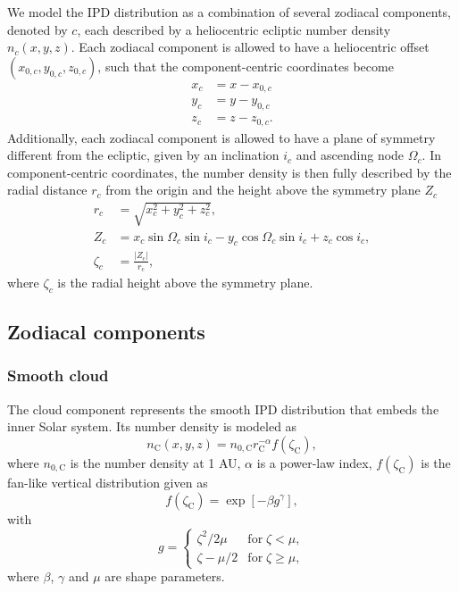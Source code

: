 \documentclass[twocolumn]{aa}
\begin{document}
We model the IPD distribution as a combination of several zodiacal 
components, denoted by $c$, each described by a heliocentric ecliptic 
number density $n_c(x,y,z)$. Each zodiacal component is allowed to have 
a heliocentric offset $(x_{0,c}, y_{0,c}, z_{0,c})$, such that the 
component-centric coordinates become
\begin{equation}    
    \begin{aligned}
        x_c&= x - x_{0,c}\\
        y_c&= y - y_{0,c}\\
        z_c&= z - z_{0,c}.
    \end{aligned}
\end{equation}
Additionally, each zodiacal component is allowed to have a plane of 
symmetry different from the ecliptic, given by an inclination $i_c$ and 
ascending node $\Omega_c$. In component-centric coordinates, the number 
density is then fully described by the radial distance $r_c$ from the 
origin and the height above the symmetry plane $Z_c$
\begin{align}
    r_c &= \sqrt{x_c^2 + y_c^2 + z_c^2},\\
    Z_c &= x_c\sin{\Omega_c}\sin{i_c} - y_c \cos{\Omega_c}\sin{i_c} + z_c \cos{i_c},\\
    \zeta_c &= \frac{|Z_\mathrm{c}|}{r_\mathrm{c}},
\end{align}
where $\zeta_c$ is the radial height above the symmetry plane.

\subsection{Zodiacal components}
\subsubsection{Smooth cloud}
The cloud component represents the smooth IPD distribution that embeds 
the inner Solar system. Its number density is modeled as
\begin{equation}
    n_\mathrm{C}(x,y,z)=n_{0, \mathrm{C}}r_\mathrm{C}^{-\alpha}f(\zeta_\mathrm{C}),
\end{equation}
where $n_{0, \mathrm{C}}$ is the number density at 1 AU, $\alpha$ is a 
power-law index, $f(\zeta_\mathrm{C})$ is the fan-like vertical 
distribution given as 
\begin{equation}
    f(\zeta_\mathrm{C}) = \exp {\left[-\beta g^\gamma \right]},
\end{equation}
with
\begin{equation}
    g = \begin{cases}
        \zeta^2/2\mu & \mathrm{for}\; \zeta < \mu,\\
        \zeta - \mu/2 & \mathrm{for}\; \zeta \geq \mu,
    \end{cases}
\end{equation}
where $\beta$, $\gamma$ and $\mu$ are shape parameters.
\end{document}
